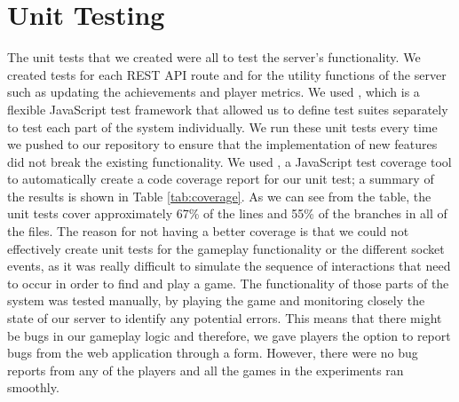 \documentclass{l4proj}
\begin{document}
\section{Unit Testing} 
The unit tests that we created were all to test the server's functionality. We created tests for each REST API route and for the utility functions of the server such as updating the achievements and player metrics. We used \cite{mocha}, which is a flexible JavaScript test framework that allowed us to define test suites separately to test each part of the system individually. We run these unit tests every time we pushed to our repository to ensure that the implementation of new features did not break the existing functionality. 
We used \cite{insta}, a JavaScript test coverage tool to automatically create a code coverage report for our unit test; a summary of the results is shown in Table \ref{tab:coverage}. As we can see from the table, the unit tests cover approximately 67\% of the lines and 55\% of the branches in all of the files. The reason for not having a better coverage is that we could not effectively create unit tests for the gameplay functionality or the different socket events, as it was really difficult to simulate the sequence of interactions that need to occur in order to find and play a game. The functionality of those parts of the system was tested manually, by playing the game and monitoring closely the state of our server to identify any potential errors. This means that there might be bugs in our gameplay logic and therefore, we gave players the option to report bugs from the web application through a form. However, there were no bug reports from any of the players and all the games in the experiments ran smoothly. 

\begin{table}
\centering
{}
\caption{A table showing the code coverage for the server's high level directories produced by Instanbul.}
\label{tab:coverage}
\end{table}
\end{document}
